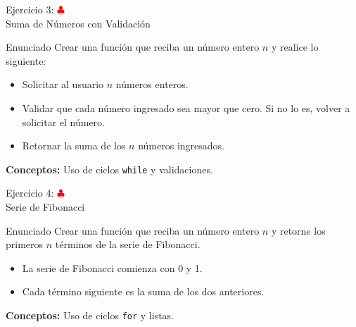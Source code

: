 \documentclass[10pt]{beamer}
\begin{document}
\begin{frame}{Ejercicio 3: \hfill \textcolor{red}{$\clubsuit$} \\ 
Suma de Números con Validación}
  \begin{block}{Enunciado}
    Crear una función que reciba un número entero \( n \) y realice lo siguiente:
    \begin{itemize}
      \item Solicitar al usuario \( n \) números enteros.
      \item Validar que cada número ingresado sea mayor que cero. Si no lo es, volver a solicitar el número.
      \item Retornar la suma de los \( n \) números ingresados.
    \end{itemize}
  \end{block}
  \textbf{Conceptos:} Uso de ciclos \texttt{while} y validaciones.
\end{frame}

\begin{frame}{Ejercicio 4: \hfill \textcolor{red}{$\clubsuit$} \\ 
Serie de Fibonacci}
  \begin{block}{Enunciado}
    Crear una función que reciba un número entero \( n \) y retorne los primeros \( n \) términos de la serie de Fibonacci.
    \begin{itemize}
      \item La serie de Fibonacci comienza con 0 y 1.
      \item Cada término siguiente es la suma de los dos anteriores.
    \end{itemize}
  \end{block}
  \textbf{Conceptos:} Uso de ciclos \texttt{for} y listas.
\end{frame}
\end{document}
